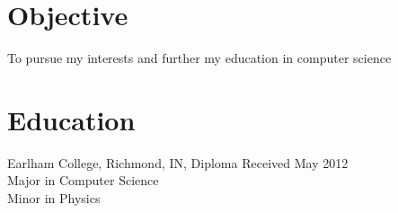 \documentclass[margin]{res}
\begin{document}
 

 
\address{{\bf Present Address} \\ 4909 Warrington Ave. \\ Philadelphia, PA 19143  \\
        (661) 231-5273}
\address{{\bf Permanent Address} \\ 1009 Lion Ct. \\ Frazier Park, CA 93225 \\ jeremy.r.hurst@gmail.com \\
         }

 
\begin{resume} 
 
\section{Objective} 
To pursue my interests and further my education in computer science
\vspace*{-1mm}
\section{Education} 
Earlham College, Richmond, IN, Diploma Received May 2012 \\
Major in Computer Science \\
Minor in Physics
 \vspace*{-1mm}

\end{resume}
\end{document}
